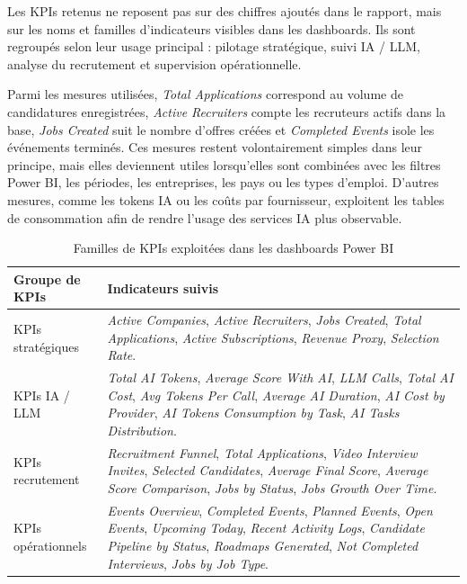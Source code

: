 Les KPIs retenus ne reposent pas sur des chiffres ajoutés dans le rapport, mais sur les noms et familles d'indicateurs visibles dans les dashboards. Ils sont regroupés selon leur usage principal : pilotage stratégique, suivi IA / LLM, analyse du recrutement et supervision opérationnelle.

Parmi les mesures utilisées, \textit{Total Applications} correspond au volume de candidatures enregistrées, \textit{Active Recruiters} compte les recruteurs actifs dans la base, \textit{Jobs Created} suit le nombre d'offres créées et \textit{Completed Events} isole les événements terminés. Ces mesures restent volontairement simples dans leur principe, mais elles deviennent utiles lorsqu'elles sont combinées avec les filtres Power BI, les périodes, les entreprises, les pays ou les types d'emploi. D'autres mesures, comme les tokens IA ou les coûts par fournisseur, exploitent les tables de consommation afin de rendre l'usage des services IA plus observable.

\begin{table}[H]
\centering
\renewcommand{\arraystretch}{1.25}
\begin{tabular}{|p{3.2cm}|p{10.4cm}|}
\hline
\textbf{Groupe de KPIs} & \textbf{Indicateurs suivis} \\
\hline
KPIs stratégiques & \textit{Active Companies}, \textit{Active Recruiters}, \textit{Jobs Created}, \textit{Total Applications}, \textit{Active Subscriptions}, \textit{Revenue Proxy}, \textit{Selection Rate}. \\
\hline
KPIs IA / LLM & \textit{Total AI Tokens}, \textit{Average Score With AI}, \textit{LLM Calls}, \textit{Total AI Cost}, \textit{Avg Tokens Per Call}, \textit{Average AI Duration}, \textit{AI Cost by Provider}, \textit{AI Tokens Consumption by Task}, \textit{AI Tasks Distribution}. \\
\hline
KPIs recrutement & \textit{Recruitment Funnel}, \textit{Total Applications}, \textit{Video Interview Invites}, \textit{Selected Candidates}, \textit{Average Final Score}, \textit{Average Score Comparison}, \textit{Jobs by Status}, \textit{Jobs Growth Over Time}. \\
\hline
KPIs opérationnels & \textit{Events Overview}, \textit{Completed Events}, \textit{Planned Events}, \textit{Open Events}, \textit{Upcoming Today}, \textit{Recent Activity Logs}, \textit{Candidate Pipeline by Status}, \textit{Roadmaps Generated}, \textit{Not Completed Interviews}, \textit{Jobs by Job Type}. \\
\hline
\end{tabular}
\caption{Familles de KPIs exploitées dans les dashboards Power BI}
\label{tab:powerbi_kpis}
\end{table}

